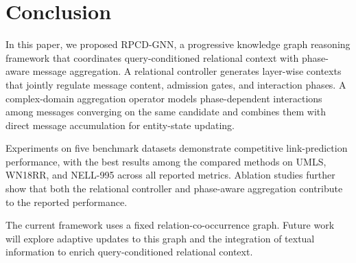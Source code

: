 \documentclass[a4paper,fleqn]{cas-dc}
\begin{document}
\FloatBarrier

\section{Conclusion}\label{sec:conclusion}

In this paper, we proposed RPCD-GNN, a progressive knowledge graph reasoning framework that coordinates query-conditioned relational context with phase-aware message aggregation. A relational controller generates layer-wise contexts that jointly regulate message content, admission gates, and interaction phases. A complex-domain aggregation operator models phase-dependent interactions among messages converging on the same candidate and combines them with direct message accumulation for entity-state updating.

Experiments on five benchmark datasets demonstrate competitive link-prediction performance, with the best results among the compared methods on UMLS, WN18RR, and NELL-995 across all reported metrics. Ablation studies further show that both the relational controller and phase-aware aggregation contribute to the reported performance.

The current framework uses a fixed relation-co-occurrence graph. Future work will explore adaptive updates to this graph and the integration of textual information to enrich query-conditioned relational context.




\end{document}
